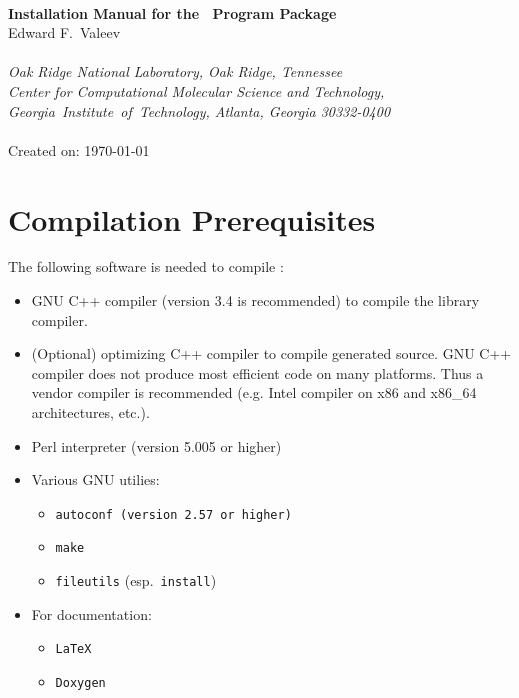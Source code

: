 \documentclass[12pt]{article}
\begin{document}


\begin{center}
\ \\
\vspace{2.0in}
{\bf {\Large Installation Manual for the \LIBINT\ Program Package}} \\
\vspace{0.5in}
Edward F.\ Valeev \\
\ \\
{\em Oak Ridge National Laboratory, Oak Ridge, Tennessee}\\
\vspace{0.1in}
{\em Center for Computational Molecular Science and Technology, \mbox{Georgia 
Institute of Technology,} Atlanta, Georgia 30332-0400} 
\ \\
\vspace{0.3in}
\LIBINTv \\
Created on: \today
\end{center}

\thispagestyle{empty}

\newpage
\section{Compilation Prerequisites}

The following software is needed to compile \LIBINTv:
\begin{itemize}
\item GNU C++ compiler (version 3.4 is recommended) to compile the library compiler.
\item (Optional) optimizing C++ compiler
to compile generated source. GNU C++ compiler does not produce most efficient code on many platforms.
Thus a vendor compiler is recommended (e.g. Intel compiler on x86 and x86\_64 architectures, etc.).
\item Perl interpreter (version 5.005 or higher)
\item Various GNU utilies: 
\begin{itemize}
\item {\tt autoconf (version 2.57 or higher)}
\item {\tt make}
\item {\tt fileutils} (esp.\ {\tt install})
\end{itemize}
\item For documentation:
\begin{itemize}
\item {\tt LaTeX}
\item {\tt Doxygen}
\end{itemize}
\end{itemize}
\end{document}
